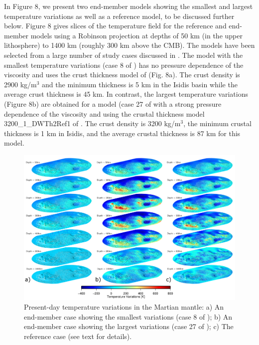 In Figure 8, we present two end-member models showing the smallest and largest temperature variations as well as a reference model, to be discussed further below. Figure 8 gives slices of the temperature field for the reference and end-member models using a Robinson projection at depths of 50 km (in the upper lithosphere) to 1400 km (roughly 300 km above the CMB). The models have been selected from a large number of study cases discussed in \citet{Plesa2016}. The model with the smallest temperature variations (case 8 of \citet{Plesa2016}) has no pressure dependence of the viscosity and uses the crust thickness model of \citet{Neumann2004} (Fig. 8a). The crust density is 2900 kg/m$^3$ and the minimum thickness is 5 km in the Isidis basin while the average crust thickness is 45 km. In contrast, the largest temperature variations (Figure 8b) are obtained for a model (case 27 of \citet{Plesa2016} with a strong pressure dependence of the viscosity and using the crustal thickness model 3200\_1\_DWTh2Ref1 of \citet{Plesa2016}. The crust density is 3200 kg/m$^3$, the minimum crustal thickness is 1 km in Isidis, and the  average crustal thickness is 87 km for this model. 
%
\begin{figure}[h!]
\begin{center}
\includegraphics[width=\textwidth]
{figures/Fig4.png}
\caption{Present-day temperature variations in the Martian mantle: a) An end-member case showing the smallest variations (case 8 of \citet{Plesa2016}); b) An end-member case showing the largest variations (case 27 of \citet{Plesa2016}); c) The reference case (see text for details).}
\label{fig:Fig4.png} 
\end{center}
\end{figure}
